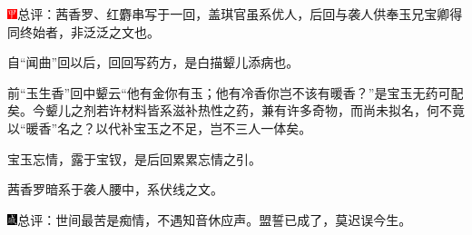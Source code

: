 {\includegraphics[width=3mm]{../Images/00002}\kaishu 总评：茜香罗、红麝串写于一回，盖琪官虽系优人，后回与袭人供奉玉兄宝卿得同终始者，非泛泛之文也。}

{\kaishu 自``闻曲''回以后，回回写药方，是白描颦儿添病也。}

{\kaishu 前``玉生香''回中颦云``他有金你有玉；他有冷香你岂不该有暖香？''是宝玉无药可配矣。今颦儿之剂若许材料皆系滋补热性之药，兼有许多奇物，而尚未拟名，何不竟以``暖香''名之？以代补宝玉之不足，岂不三人一体矣。}

{\kaishu 宝玉忘情，露于宝钗，是后回累累忘情之引。}

{\kaishu 茜香罗暗系于袭人腰中，系伏线之文。}

{\includegraphics[width=3mm]{../Images/00005}\kaishu 总评：世间最苦是痴情，不遇知音休应声。盟誓已成了，莫迟误今生。}

%
%
%
